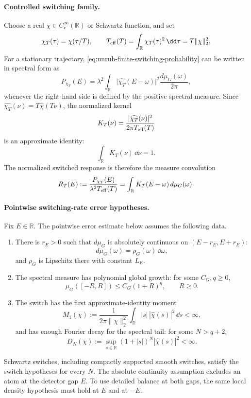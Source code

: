 \paragraph{Controlled switching family.}
Choose a real \(\chi\in C_c^\infty(\mathbb R)\) or Schwartz function, and set
\[
  \chi_T(\tau)=\chi(\tau/T),\qquad
  T_{\rm eff}(T)=\int_{\mathbb R}\chi_T(\tau)^2\,\dd\tau
  =
  T\|\chi\|_2^2 .
\]
For a stationary trajectory, \eqref{eq:unruh-finite-switching-probability}
can be written in spectral form as
\begin{equation}
  P_{\chi_T}(E)
  =
  \lambda^2
  \int_{\mathbb R}
  \bigl|\widehat{\chi_T}(E-\omega)\bigr|^2
  \frac{d\mu_G(\omega)}{2\pi},
  \label{eq:unruh-switched-response-spectral-convolution}
\end{equation}
whenever the right-hand side is defined by the positive spectral measure.
Since
\(\widehat{\chi_T}(\nu)=T\widehat\chi(T\nu)\), the normalized kernel
\[
  K_T(\nu)
  =
  \frac{|\widehat{\chi_T}(\nu)|^2}{2\pi T_{\rm eff}(T)}
\]
is an approximate identity:
\[
  \int_{\mathbb R}K_T(\nu)\,\dd\nu=1.
\]
The normalized switched response is therefore the measure convolution
\[
  R_T(E)
  :=
  \frac{P_{\chi_T}(E)}{\lambda^2T_{\rm eff}(T)}
  =
  \int_{\mathbb R}K_T(E-\omega)\,d\mu_G(\omega).
\]

\paragraph{Pointwise switching-rate error hypotheses.}
Fix \(E\in\mathbb R\).  The pointwise error estimate below assumes the
following data.
\begin{enumerate}[label=\textup{(\roman*)}]
\item There is \(r_E>0\) such that \(d\mu_G\) is absolutely continuous on
\((E-r_E,E+r_E)\):
\[
  d\mu_G(\omega)=\rho_G(\omega)\,\dd\omega ,
\]
and \(\rho_G\) is Lipschitz there with constant \(L_E\).
\item The spectral measure has polynomial global growth: for some
\(C_G,q\ge0\),
\[
  \mu_G([-R,R])\le C_G(1+R)^q,
  \qquad R\ge0 .
\]
\item The switch has the first approximate-identity moment
\[
  M_1(\chi)
  :=
  \frac{1}{2\pi\|\chi\|_2^2}
  \int_{\mathbb R}|s|\,|\widehat\chi(s)|^2\,\dd s
  <\infty ,
\]
and has enough Fourier decay for the spectral tail: for some
\(N>q+2\),
\[
  D_N(\chi)
  :=
  \sup_{s\in\mathbb R}(1+|s|)^N|\widehat\chi(s)|^2
  <\infty .
\]
\end{enumerate}
Schwartz switches, including compactly supported smooth switches, satisfy
the switch hypotheses for every \(N\).  The absolute continuity assumption
excludes an atom at the detector gap \(E\).  To use detailed balance at both
gaps, the same local density hypothesis must hold at \(E\) and at \(-E\).


